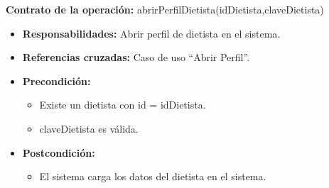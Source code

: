 \textbf{Contrato de la operación:} abrirPerfilDietista(idDietista,claveDietista)
\begin{itemize}
\item \textbf{Responsabilidades:} Abrir perfil de dietista en el sistema.
\item \textbf{Referencias cruzadas:} Caso de uso ``Abrir Perfil''.
\item \textbf{Precondición:}
\begin{itemize}
\item Existe un dietista con id = idDietista.
\item claveDietista es válida.
\end{itemize}
\item \textbf{Postcondición:}
\begin{itemize}
\item El sistema carga los datos del dietista en el sistema.
\end{itemize}
\end{itemize}

